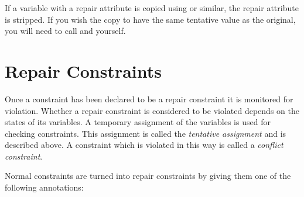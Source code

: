 If a variable with a repair attribute is copied using
or similar, the repair attribute is stripped.  If you wish the copy to have
the same tentative value as the original, you will need to call
and
yourself.


\section{Repair Constraints}

Once a constraint has been declared to be a repair constraint it
is monitored for violation.   Whether a repair 
constraint is considered to be violated depends on the states of 
its variables.  A temporary assignment of the variables is used 
for checking constraints.  This assignment is called the
{\em tentative assignment} and is described above.
A constraint which is violated in this way is called a
{\em conflict constraint}.

Normal constraints are turned into repair constraints by giving them
one of the following annotations:

